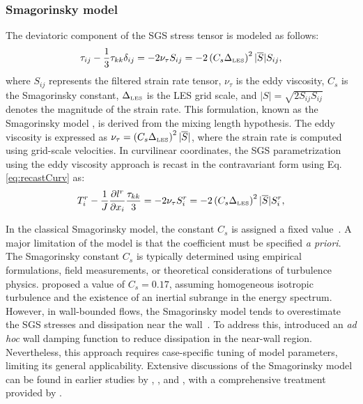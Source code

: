 \documentclass[final,3p]{elsarticle}
\begin{document}
\subsubsection{Smagorinsky model}
The deviatoric component of the SGS stress tensor is modeled as follows:
\begin{equation}
	\tau_{ij} - \frac{1}{3}\tau_{kk}\delta_{ij} = -2 \nu_{\tau} S_{ij} = -2 \left( C_s \Delta_{\hbox{\tiny LES}} \right)^2 |\overline{S}| S_{ij},
	\label{eq:SmagorinskyModel}
\end{equation}
where $S_{ij}$ represents the filtered strain rate tensor, $\nu_{\tau}$ is the eddy viscosity, $C_s$ is the Smagorinsky constant, $\Delta_{\hbox{\tiny LES}}$ is the LES grid scale, and $\lvert {S} \rvert = \sqrt{2 S_{ij} S_{ij}}$ denotes the magnitude of the strain rate. This formulation, known as the Smagorinsky model \cite{smagorinsky1963}, is derived from the mixing length hypothesis. The eddy viscosity is expressed as $\nu_{\tau} = \left( C_s \Delta_{\hbox{\tiny LES}} \right)^2 |\overline{S}|$, where the strain rate is computed using grid-scale velocities. In curvilinear coordinates, the SGS parametrization using the eddy viscosity approach is recast in the contravariant form using Eq. \ref{eq:recastCurv} as:
\begin{equation}
	T^r_i- \frac{1}{J}\frac{\partial l^{r}}{\partial x_i} \frac{\tau_{kk}}{3} = -2 \nu_{\tau} S^r_i = -2 \left( C_s \Delta_{\hbox{\tiny LES}} \right)^2 |\overline{S}| S^r_{i},
	\label{eq:SmagorinskyModel}
\end{equation}

In the classical Smagorinsky model, the constant \( C_s \) is assigned a fixed value~\cite{lilly1967}. A major limitation of the model is that the coefficient must be specified \textit{a priori}. The Smagorinsky constant \( C_s \) is typically determined using empirical formulations, field measurements, or theoretical considerations of turbulence physics. \citet{lilly1967} proposed a value of \( C_s = 0.17 \), assuming homogeneous isotropic turbulence and the existence of an inertial subrange in the energy spectrum. However, in wall-bounded flows, the Smagorinsky model tends to overestimate the SGS stresses and dissipation near the wall~\cite{piomelli1991large, meneveau2000scale}. To address this, \citet{moin1982numerical} introduced an \textit{ad hoc} wall damping function to reduce dissipation in the near-wall region. Nevertheless, this approach requires case-specific tuning of model parameters, limiting its general applicability. Extensive discussions of the Smagorinsky model can be found in earlier studies by \citet{moin1982numerical}, \citet{rogallo1984numerical}, and \citet{lesieur1996new}, with a comprehensive treatment provided by \citet{pope2001turbulent}.
\end{document}
